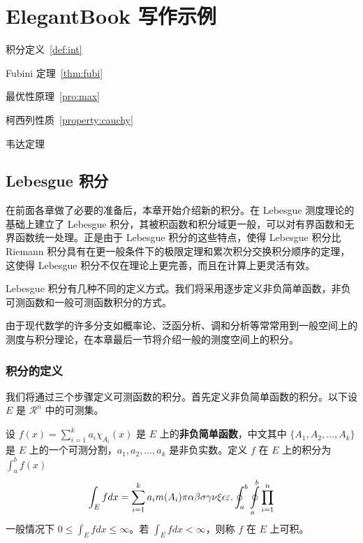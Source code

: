 \documentclass[lang=cn,10pt]{elegantbook}
\begin{document}
\chapter{ElegantBook 写作示例}

\begin{introduction}
  \item 积分定义~\ref{def:int}
  \item Fubini 定理~\ref{thm:fubi}
  \item 最优性原理~\ref{pro:max}
  \item 柯西列性质~\ref{property:cauchy}
  \item 韦达定理
\end{introduction}

\section{Lebesgue 积分}
在前面各章做了必要的准备后，本章开始介绍新的积分。在 Lebesgue 测度理论的基础上建立了 Lebesgue 积分，其被积函数和积分域更一般，可以对有界函数和无界函数统一处理。正是由于 Lebesgue 积分的这些特点，使得 Lebesgue 积分比 Riemann 积分具有在更一般条件下的极限定理和累次积分交换积分顺序的定理，这使得 Lebesgue 积分不仅在理论上更完善，而且在计算上更灵活有效。

Lebesgue 积分有几种不同的定义方式。我们将采用逐步定义非负简单函数，非负可测函数和一般可测函数积分的方式。

由于现代数学的许多分支如概率论、泛函分析、调和分析等常常用到一般空间上的测度与积分理论，在本章最后一节将介绍一般的测度空间上的积分。

\subsection{积分的定义}

我们将通过三个步骤定义可测函数的积分。首先定义非负简单函数的积分。以下设 $E$ 是 $\mathcal{R}^n$ 中的可测集。

\begin{definition}[可积性] \label{def:int} 
设 $ f(x)=\sum\limits_{i=1}^{k} a_i \chi_{A_i}(x)$ 是 $E$ 上的\textbf{非负简单函数}，中文其中 $\{A_1,A_2,\ldots,A_k\}$ 是 $E$ 上的一个可测分割，$a_1,a_2,\ldots,a_k$ 是非负实数。定义 $f$ 在 $E$ 上的积分为 $\int_{a}^b f(x)$
\begin{equation}
   \label{inter}
   \int_{E} f dx = \sum_{i=1}^k a_i m(A_i) \pi \alpha\beta\sigma\gamma\nu\xi\epsilon\varepsilon. \oint_{a}^b\ointop_{a}^b\prod_{i=1}^n
\end{equation}
一般情况下 $0 \leq \int_{E} f dx \leq \infty$。若 $\int_{E} f dx < \infty$，则称 $f$ 在 $E$ 上可积。
\end{definition}
\end{document}
